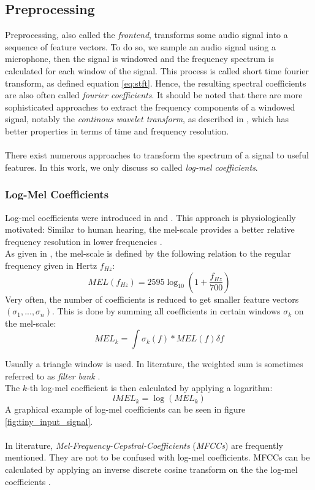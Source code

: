 \subsection{Preprocessing}
Preprocessing, also called the \textit{frontend}, transforms some audio signal into a sequence of feature vectors. To do so, we sample an audio signal using a microphone, then the signal is windowed and the frequency spectrum is calculated for each window of the signal. This process is called short time fourier transform, as defined equation \ref{eq:stft}. Hence, the resulting spectral coefficients are also often called \textit{fourier coefficients}. It should be noted that there are more sophisticated approaches to extract the frequency components of a windowed signal, notably the \textit{continous wavelet transform}, as described in \cite{mallat1999wavelet}, which has better properties in terms of time and frequency resolution. \\ \\
There exist numerous approaches to transform the spectrum of a signal to useful features. In this work, we only discuss so called \textit{log-mel coefficients}. 
\subsubsection{Log-Mel Coefficients}
\label{sec:lmel}
Log-mel coefficients were introduced in \cite{waibel1990phoneme} and \cite{waibel1983comparative}. This approach is physiologically motivated: Similar to human hearing, the mel-scale provides a better relative frequency resolution in lower frequencies \cite{waibel1990phoneme}. \\
As given in \cite{poser1990speech}, the mel-scale is defined by the following relation to the regular frequency given in Hertz $f_{Hz}$: 
\[
MEL(f_{Hz})=2595\log _{10}\left(1+{\frac {f_{Hz}}{700}}\right)
\]
Very often, the number of coefficients is reduced to get smaller feature vectors $(\sigma_1, ..., \sigma_n)$. This is done by summing all coefficients in certain windows $\sigma_k$ on the mel-scale: 
\[
MEL_k = \int \sigma_k(f) * MEL(f) \delta f 
\]

Usually a triangle window is used. In literature, the weighted sum is sometimes referred to as \textit{filter bank} \cite{zhan1997vocal}. \\
The $k$-th log-mel coefficient is then calculated by applying a logarithm:
\[
lMEL_k = \log(MEL_k) 
\]
A graphical example of log-mel coefficients can be seen in figure \ref{fig:tiny_input_signal}.
\\ \\
In literature, \textit{Mel-Frequency-Cepstral-Coefficients} (\textit{MFCCs}) are frequently mentioned. They are not to be confused with log-mel coefficients. MFCCs can be calculated by applying an inverse discrete cosine transform on the the log-mel coefficients \cite{davis1990comparison}.

